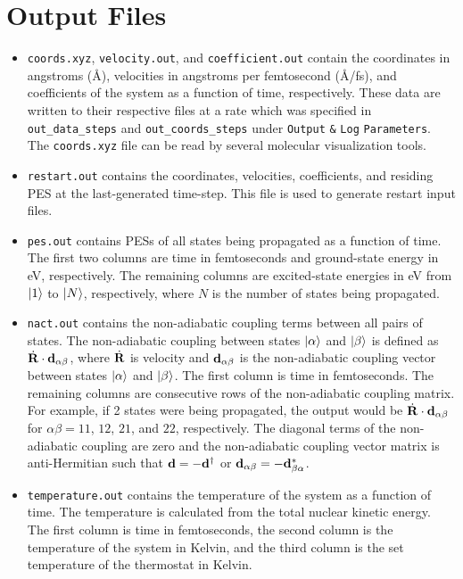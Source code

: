 \documentclass[letterpaper,12pt,titlepage]{article}
\begin{document}
\section{Output Files}
\begin{itemize}
\item \verb+coords.xyz+, \verb+velocity.out+, and \verb+coefficient.out+ contain the coordinates in angstroms (\AA), velocities in angstroms per femtosecond (\AA/fs), and coefficients of the system as a function of time, respectively.  These data are written to their respective files at a rate which was specified in \verb+out_data_steps+ and \verb+out_coords_steps+ under \verb+Output+ \verb+&+ \verb+Log+ \verb+Parameters+.  The \verb+coords.xyz+ file can be read by several molecular visualization tools.
\item \verb+restart.out+ contains the coordinates, velocities, coefficients, and residing PES at the last-generated time-step.  This file is used to generate restart input files.
\item \verb+pes.out+ contains PESs of all states being propagated as a function of time.  The first two columns are time in femtoseconds and ground-state energy in eV, respectively.  The remaining columns are excited-state energies in eV from $\ket{1}$ to $\ket{N}$, respectively, where $N$ is the number of states being propagated.
\item \verb+nact.out+ contains the non-adiabatic coupling terms between all pairs of states.  The non-adiabatic coupling between states $\ket{\alpha}$ and $\ket{\beta}$ is defined as $\dot{{\bf{R}}}\cdot{\bf{d}}_{\alpha\beta}$, where $\dot{{\bf{R}}}$ is velocity and ${\bf{d}}_{\alpha\beta}$ is the non-adiabatic coupling vector between states $\ket{\alpha}$ and ${\ket{\beta}}$.  The first column is time in femtoseconds.  The remaining columns are consecutive rows of the non-adiabatic coupling matrix.  For example, if 2 states were being propagated, the output would be $\dot{{\bf{R}}}\cdot{\bf{d}}_{\alpha\beta}$ for $\alpha\beta=11$, $12$, $21$, and $22$, respectively.  The diagonal terms of the non-adiabatic coupling are zero and the non-adiabatic coupling vector matrix is anti-Hermitian such that ${\bf{d}}=-{\bf{d}}^{\dagger}$ or ${\bf{d}}_{\alpha\beta}=-{\bf{d}}_{\beta\alpha}^{*}$.
\item \verb+temperature.out+ contains the temperature of the system as a function of time.  The temperature is calculated from the total nuclear kinetic energy.  The first column is time in femtoseconds, the second column is the temperature of the system in Kelvin, and the third column is the set temperature of the thermostat in Kelvin.

\end{itemize}
\end{document}
